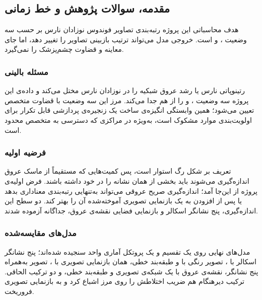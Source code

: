 \subsection{مقدمه، سوالات پژوهش و خط زمانی}

هدف محاسباتی این پروژه رتبه‌بندی تصاویر فوندوس نوزادان نارس بر حسب سه وضعیت ،  و  است. خروجی مدل می‌تواند ترتیب بازبینی تصاویر را تغییر دهد، اما جای معاینه و قضاوت چشم‌پزشک را نمی‌گیرد.

\subsubsection{مسئله بالینی}

رتینوپاتی نارس یا  رشد عروق شبکیه را در نوزادان نارس مختل می‌کند و داده‌ی این پروژه سه وضعیت ،  و  را از هم جدا می‌کند. مرز این سه وضعیت با قضاوت متخصص تعیین می‌شود؛ همین وابستگی انگیزه‌ی ساخت یک زنجیره‌ی پردازشی قابل تکرار برای اولویت‌بندی موارد مشکوک است، به‌ویژه در مراکزی که دسترسی به متخصص محدود است.

\subsubsection{فرضیه اولیه}

تعریف  بر شکل رگ استوار است، پس کمیت‌هایی که مستقیماً از ماسک عروق اندازه‌گیری می‌شوند باید بخشی از همان نشانه را در خود داشته باشند. فرض اولیه‌ی پروژه از این‌جا آمد؛ اندازه‌گیری صریح عروقی می‌تواند به‌تنهایی رتبه‌بندی معناداری بدهد یا پس از افزودن به یک بازنمایی تصویری آموخته‌شده آن را بهتر کند. دو سطح این اندازه‌گیری، پنج نشانگر اسکالر و بازنمایی فضایی نقشه‌ی عروق، جداگانه آزموده شدند.

\subsubsection{مدل‌های مقایسه‌شده}

مدل‌های نهایی روی یک تقسیم و یک پروتکل آماری واحد سنجیده شده‌اند؛ پنج نشانگر اسکالر با ، تصویر رنگی با  و طبقه‌بند خطی، همان بازنمایی تصویری با ، تصویر به‌همراه پنج نشانگر، نقشه‌ی عروق با یک شبکه‌ی تصویری و طبقه‌بند خطی، و دو ترکیب الحاقی. ترکیب دیرهنگام هم ضریب اختلاطش را روی مرز اشباع کرد و به بازنمایی تصویری فروریخت.

